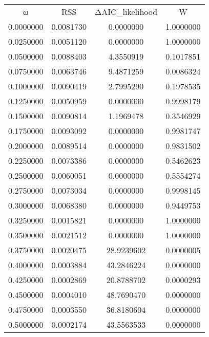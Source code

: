\begin{tabular}{cccc}
ω & RSS & ΔAIC_likelihood & W\\
0.0000000 & 0.0081730 & 0.0000000 & 1.0000000\\
0.0250000 & 0.0051120 & 0.0000000 & 1.0000000\\
0.0500000 & 0.0088403 & 4.3550919 & 0.1017851\\
0.0750000 & 0.0063746 & 9.4871259 & 0.0086324\\
0.1000000 & 0.0090419 & 2.7995290 & 0.1978535\\
0.1250000 & 0.0050959 & 0.0000000 & 0.9998179\\
0.1500000 & 0.0090814 & 1.1969478 & 0.3546929\\
0.1750000 & 0.0093092 & 0.0000000 & 0.9981747\\
0.2000000 & 0.0089514 & 0.0000000 & 0.9831502\\
0.2250000 & 0.0073386 & 0.0000000 & 0.5462623\\
0.2500000 & 0.0060051 & 0.0000000 & 0.5554274\\
0.2750000 & 0.0073034 & 0.0000000 & 0.9998145\\
0.3000000 & 0.0068380 & 0.0000000 & 0.9449753\\
0.3250000 & 0.0015821 & 0.0000000 & 1.0000000\\
0.3500000 & 0.0021512 & 0.0000000 & 1.0000000\\
0.3750000 & 0.0020475 & 28.9239602 & 0.0000005\\
0.4000000 & 0.0003884 & 43.2846224 & 0.0000000\\
0.4250000 & 0.0002869 & 20.8788702 & 0.0000293\\
0.4500000 & 0.0004010 & 48.7690470 & 0.0000000\\
0.4750000 & 0.0003550 & 36.8180604 & 0.0000000\\
0.5000000 & 0.0002174 & 43.5563533 & 0.0000000\\
\end{tabular}
